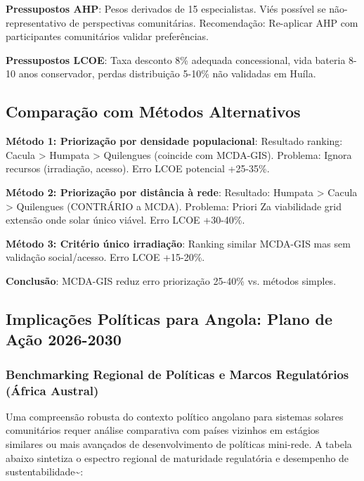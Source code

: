 \documentclass[12pt, a4paper]{article}
\begin{document}
\textbf{Pressupostos AHP}: Pesos derivados de 15 especialistas. Viés possível se não-representativo de perspectivas comunitárias. Recomendação: Re-aplicar AHP com participantes comunitários validar preferências.

\textbf{Pressupostos LCOE}: Taxa desconto 8\% adequada concessional, vida bateria 8-10 anos conservador, perdas distribuição 5-10\% não validadas em Huíla.

\subsection{Comparação com Métodos Alternativos}

\textbf{Método 1: Priorização por densidade populacional}: Resultado ranking: Cacula > Humpata > Quilengues (coincide com MCDA-GIS). Problema: Ignora recursos (irradiação, acesso). Erro LCOE potencial +25-35\%.

\textbf{Método 2: Priorização por distância à rede}: Resultado: Humpata > Cacula > Quilengues (CONTRÁRIO a MCDA). Problema: Priori Za viabilidade grid extensão onde solar único viável. Erro LCOE +30-40\%.

\textbf{Método 3: Critério único irradiação}: Ranking similar MCDA-GIS mas sem validação social/acesso. Erro LCOE +15-20\%.

\textbf{Conclusão}: MCDA-GIS reduz erro priorização 25-40\% vs. métodos simples.

\subsection{Implicações Políticas para Angola: Plano de Ação 2026-2030}

\subsubsection{Benchmarking Regional de Políticas e Marcos Regulatórios (África Austral)}

Uma compreensão robusta do contexto político angolano para sistemas solares comunitários requer análise comparativa com países vizinhos em estágios similares ou mais avançados de desenvolvimento de políticas mini-rede. A tabela abaixo sintetiza o espectro regional de maturidade regulatória e desempenho de sustentabilidade\textasciitilde{}\citep{Chirwa2024}:
\end{document}
